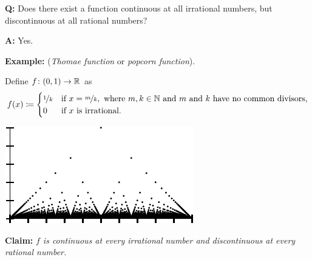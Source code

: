 \documentclass[10pt,aspectratio=169]{beamer}
\begin{document}
\begin{frame}

\textbf{Q:}
Does there exist a function continuous at all irrational numbers, but
discontinuous at all rational numbers?

\pause
\medskip

\textbf{A:} Yes.

\pause
\medskip


\textbf{Example:} (\emph{Thomae function} or \emph{popcorn function}).

Define $f \colon (0,1) \to {\mathbb{R}}$ as
\begin{equation*}
f(x) \coloneqq 
\begin{cases}
\nicefrac{1}{k} & \text{if } x=\nicefrac{m}{k}, \text{ where } m,k \in {\mathbb{N}}
\text{ and } m \text{ and } k \text{ have no common divisors,} \\
0 & \text{if } x \text{ is irrational.}
\end{cases}
\end{equation*}

\begin{center}
\includegraphics{../figures/popcornfig}
\end{center}

\pause
\medskip

\textbf{Claim:} \emph{$f$ is continuous at every irrational number and discontinuous at every
rational number.}

\end{frame}
\end{document}

